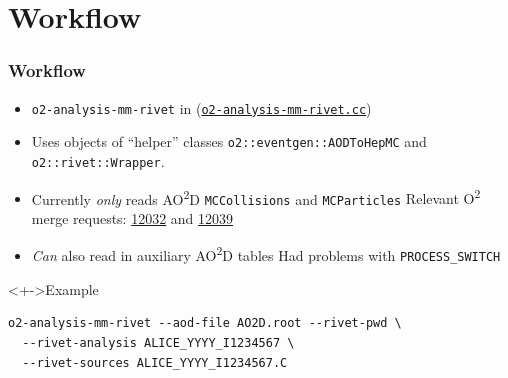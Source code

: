 \documentclass[compress,table,8pt]{beamer}
\newcommand\Otwo{O\textsuperscript{2}}
\newcommand\AOD{AO\textsuperscript{2}D}
\begin{document}
\section{Workflow}
\begin{frame}[fragile]
  \frametitle{Workflow}

  \begin{itemize}
  \item<+-> \texttt{o2-analysis-mm-rivet} in
    (\href{https://gitlab.com/cholmcc/O2Rivet/-/blob/master/o2-analysis-mm-rivet.cc}{\texttt{o2-analysis-mm-rivet.cc}})
  \item<+-> Uses objects of ``helper'' classes
    \texttt{o2::eventgen::AODToHepMC} and \texttt{o2::rivet::Wrapper}.
  \item<+-> Currently \emph{only} reads \AOD{} \texttt{MCCollisions}
    and \texttt{MCParticles}\newline
    {\footnotesize Relevant \Otwo{} merge requests:
      \href{https://github.com/AliceO2Group/AliceO2/pull/12032}{12032}
      and
      \href{https://github.com/AliceO2Group/AliceO2/pull/12039}{12039}
    }
  \item<+-> \emph{Can} also read in auxiliary \AOD{} tables\newline
    {\footnotesize Had problems with \texttt{PROCESS\_SWITCH}}
  \end{itemize}

  \begin{exampleblock}<+->{Example}
\begin{verbatim}
o2-analysis-mm-rivet --aod-file AO2D.root --rivet-pwd \
  --rivet-analysis ALICE_YYYY_I1234567 \
  --rivet-sources ALICE_YYYY_I1234567.C
\end{verbatim}
  \end{exampleblock}
\end{frame}
\end{document}
